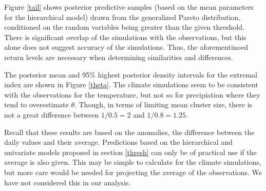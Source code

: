 \documentclass[12pt]{article}
\begin{document}
Figure \ref{tail} shows posterior predictive samples (based on the mean parameters for the hierarchical model) drawn from the generalized Pareto distribution, conditioned on the random variables being greater than the given threshold. There is significant overlap of the simulations with the observations, but this alone does not suggest accuracy of the simulations. Thus, the aforementinoed return levels are necessary when determining similarities and differences.

The posterior mean and 95\% highest posterior density intervals for the extremal index are shown in Figure \ref{theta}. The climate simulations seem to be consistent with the observations for the temperature, but not so for precipiation where they tend to overestimate $\theta$. Though, in terms of limiting mean cluster size, there is not a great difference between $1/0.5=2$ and $1/0.8=1.25$.

Recall that these results are based on the anomalies, the difference between the daily values and their average. Predictions based on the hierarchical and univariate models proposed in section \ref{thresh} can only be of practical use if the average is also given. This may be simple to calculate for the climate simulations, but more care would be needed for projecting the average of the observations. We have not considered this in our analysis.
\end{document}
